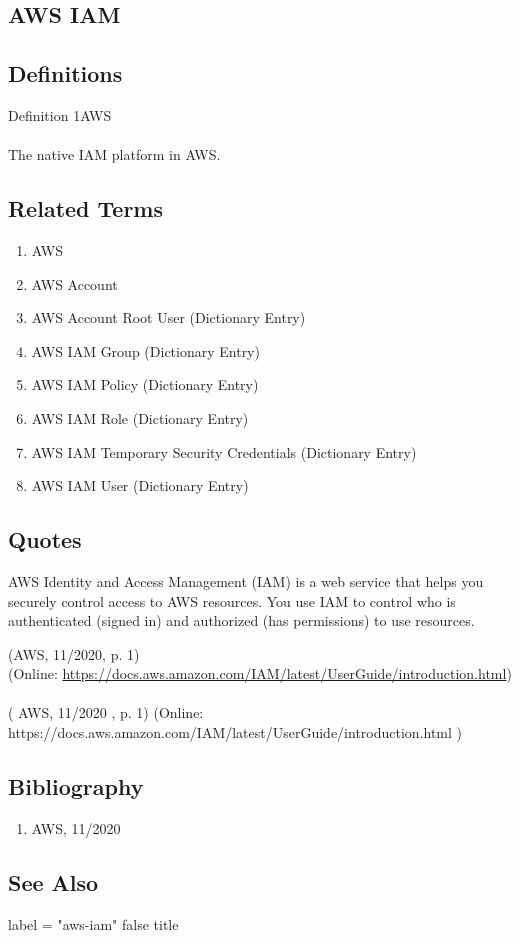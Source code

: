\newpage \subsection*{AWS IAM } \subsection*{Definitions } \begin{DIC_Def}{Definition 1AWS }{} \paragraph{} The native IAM platform in AWS.  \end{DIC_Def} \subsection*{Related Terms } \begin{enumerate} \item  AWS  \item  AWS Account  \item  AWS Account Root User (Dictionary Entry)    \item  AWS IAM Group (Dictionary Entry)    \item  AWS IAM Policy (Dictionary Entry)    \item  AWS IAM Role (Dictionary Entry)    \item  AWS IAM Temporary Security Credentials (Dictionary Entry)    \item  AWS IAM User (Dictionary Entry)    \end{enumerate} \subsection*{Quotes } \begin{DIC_BlockQuote} AWS Identity and Access Management (IAM) is a web service that helps you securely control access to AWS resources. You use IAM to control who is authenticated (signed in) and authorized (has permissions) to use resources.  \end{DIC_BlockQuote} (AWS, 11/2020, p. 1)\\ (Online: \url{https://docs.aws.amazon.com/IAM/latest/UserGuide/introduction.html})  \paragraph{} (  AWS, 11/2020  , p. 1)  (Online:  https://docs.aws.amazon.com/IAM/latest/UserGuide/introduction.html  )  \subsection*{Bibliography } \begin{enumerate} \item  AWS, 11/2020    \end{enumerate} \subsection*{See Also } label = "aws-iam"  false  title  